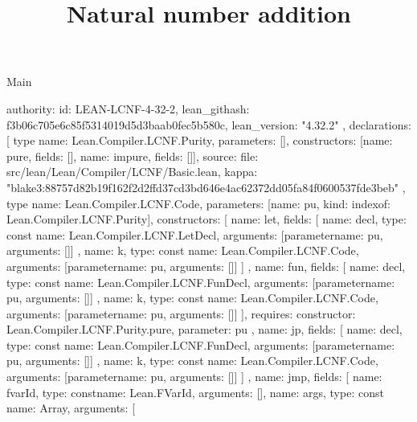 \begin{lexlean}{Main}
\title{Natural number addition}
\begin{toolingmodule}
{
  authority: {
    id: LEAN-LCNF-4-32-2,
    lean_githash: f3b06c705e6c85f5314019d5d3baab0fec5b580c,
    lean_version: "4.32.2"
  },
  declarations: [
    type{
      name: Lean.Compiler.LCNF.Purity,
      parameters: [],
      constructors: [{name: pure, fields: []}, {name: impure, fields: []}],
      source: {
        file: src/lean/Lean/Compiler/LCNF/Basic.lean,
        kappa: "blake3:88757d82b19f162f2d2ffd37cd3bd646e4ac62372dd05fa84f0600537fde3beb"
      }
    },
    type{
      name: Lean.Compiler.LCNF.Code,
      parameters: [{name: pu, kind: index{of: Lean.Compiler.LCNF.Purity}}],
      constructors: [
        {
          name: let,
          fields: [
            {
              name: decl,
              type: const{
                name: Lean.Compiler.LCNF.LetDecl,
                arguments: [parameter{name: pu, arguments: []}]
              }
            },
            {
              name: k,
              type: const{
                name: Lean.Compiler.LCNF.Code,
                arguments: [parameter{name: pu, arguments: []}]
              }
            }
          ]
        },
        {
          name: fun,
          fields: [
            {
              name: decl,
              type: const{
                name: Lean.Compiler.LCNF.FunDecl,
                arguments: [parameter{name: pu, arguments: []}]
              }
            },
            {
              name: k,
              type: const{
                name: Lean.Compiler.LCNF.Code,
                arguments: [parameter{name: pu, arguments: []}]
              }
            }
          ],
          requires: {constructor: Lean.Compiler.LCNF.Purity.pure, parameter: pu}
        },
        {
          name: jp,
          fields: [
            {
              name: decl,
              type: const{
                name: Lean.Compiler.LCNF.FunDecl,
                arguments: [parameter{name: pu, arguments: []}]
              }
            },
            {
              name: k,
              type: const{
                name: Lean.Compiler.LCNF.Code,
                arguments: [parameter{name: pu, arguments: []}]
              }
            }
          ]
        },
        {
          name: jmp,
          fields: [
            {name: fvarId, type: const{name: Lean.FVarId, arguments: []}},
            {
              name: args,
              type: const{
                name: Array,
                arguments: [
}}}}}
\end{toolingmodule}
\end{lexlean}
